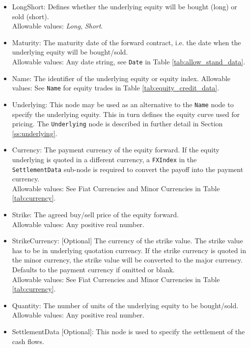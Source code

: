 \begin{itemize}
	\item LongShort: Defines whether the underlying equity will be bought (long) or sold (short). \\
	Allowable values:  \emph{Long}, \emph{Short}.
	\item Maturity: The maturity date of the forward contract, i.e. the date when the underlying equity will be bought/sold. \\
	Allowable values: Any date string, see \lstinline!Date! in Table \ref{tab:allow_stand_data}.
	\item Name: The identifier of the underlying equity or equity index. 
	Allowable values:  See \lstinline!Name! for equity trades in Table \ref{tab:equity_credit_data}. \\
	\item Underlying:  This node may be used as an alternative to the \lstinline!Name! node to specify the underlying equity. This in turn defines the equity curve used for pricing. 
		The \lstinline!Underlying! node is described in further detail in Section \ref{ss:underlying}. \\
	\item Currency: The payment currency of the equity forward. If the equity underlying is quoted in a different currency, a 
		\lstinline!FXIndex! in the \lstinline!SettlementData! sub-node is required to convert the payoff into the payment currency.\\
	Allowable values:  See Fiat Currencies and Minor Currencies in Table \ref{tab:currency}.
	\item Strike: The agreed buy/sell price of the equity forward.\\
	Allowable values:  Any positive real number.	
	\item StrikeCurrency: [Optional] The currency of the strike value. The strike value has to be in underlying quotation currency. 
		If the strike currency is quoted in the minor currency, the strike value will be converted to the major currency. 
		Defaults to the payment currency if omitted or blank.\\
	Allowable values:  See Fiat Currencies and Minor Currencies in Table \ref{tab:currency}.	
	\item Quantity: The number of units of the underlying equity to be bought/sold. \\
	Allowable values:  Any positive real number.
	\item SettlementData [Optional]: This node is used to specify the settlement of the cash flows.
\end{itemize}

